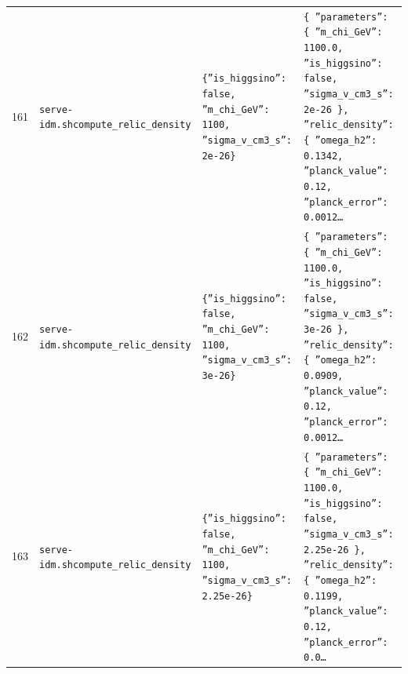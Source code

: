 \documentclass[11pt,a4paper]{article}
\begin{document}
\begin{longtable}{@{}p{}p{}p{}p{}@{}}
161 & \texttt{serve-idm.sh}\newline\texttt{compute\_\allowbreak{}relic\_\allowbreak{}density} & \texttt{\{''is\_\allowbreak{}higgsino'':\allowbreak{} false,\allowbreak{} ''m\_\allowbreak{}chi\_\allowbreak{}GeV'':\allowbreak{} 1100,\allowbreak{} ''sigma\_\allowbreak{}v\_\allowbreak{}cm3\_\allowbreak{}s'':\allowbreak{} 2e-26\}\allowbreak{}} & \texttt{\{   ''parameters'':\allowbreak{} \{     ''m\_\allowbreak{}chi\_\allowbreak{}GeV'':\allowbreak{} 1100.0,\allowbreak{}     ''is\_\allowbreak{}higgsino'':\allowbreak{} false,\allowbreak{}     ''sigma\_\allowbreak{}v\_\allowbreak{}cm3\_\allowbreak{}s'':\allowbreak{} 2e-26   \}\allowbreak{},\allowbreak{}   ''relic\_\allowbreak{}density'':\allowbreak{} \{     ''omega\_\allowbreak{}h2'':\allowbreak{} 0.1342,\allowbreak{}     ''planck\_\allowbreak{}value'':\allowbreak{} 0.12,\allowbreak{}     ''planck\_\allowbreak{}error'':\allowbreak{} 0.0012\ldots{}\allowbreak{}} \\
162 & \texttt{serve-idm.sh}\newline\texttt{compute\_\allowbreak{}relic\_\allowbreak{}density} & \texttt{\{''is\_\allowbreak{}higgsino'':\allowbreak{} false,\allowbreak{} ''m\_\allowbreak{}chi\_\allowbreak{}GeV'':\allowbreak{} 1100,\allowbreak{} ''sigma\_\allowbreak{}v\_\allowbreak{}cm3\_\allowbreak{}s'':\allowbreak{} 3e-26\}\allowbreak{}} & \texttt{\{   ''parameters'':\allowbreak{} \{     ''m\_\allowbreak{}chi\_\allowbreak{}GeV'':\allowbreak{} 1100.0,\allowbreak{}     ''is\_\allowbreak{}higgsino'':\allowbreak{} false,\allowbreak{}     ''sigma\_\allowbreak{}v\_\allowbreak{}cm3\_\allowbreak{}s'':\allowbreak{} 3e-26   \}\allowbreak{},\allowbreak{}   ''relic\_\allowbreak{}density'':\allowbreak{} \{     ''omega\_\allowbreak{}h2'':\allowbreak{} 0.0909,\allowbreak{}     ''planck\_\allowbreak{}value'':\allowbreak{} 0.12,\allowbreak{}     ''planck\_\allowbreak{}error'':\allowbreak{} 0.0012\ldots{}\allowbreak{}} \\
163 & \texttt{serve-idm.sh}\newline\texttt{compute\_\allowbreak{}relic\_\allowbreak{}density} & \texttt{\{''is\_\allowbreak{}higgsino'':\allowbreak{} false,\allowbreak{} ''m\_\allowbreak{}chi\_\allowbreak{}GeV'':\allowbreak{} 1100,\allowbreak{} ''sigma\_\allowbreak{}v\_\allowbreak{}cm3\_\allowbreak{}s'':\allowbreak{} 2.25e-26\}\allowbreak{}} & \texttt{\{   ''parameters'':\allowbreak{} \{     ''m\_\allowbreak{}chi\_\allowbreak{}GeV'':\allowbreak{} 1100.0,\allowbreak{}     ''is\_\allowbreak{}higgsino'':\allowbreak{} false,\allowbreak{}     ''sigma\_\allowbreak{}v\_\allowbreak{}cm3\_\allowbreak{}s'':\allowbreak{} 2.25e-26   \}\allowbreak{},\allowbreak{}   ''relic\_\allowbreak{}density'':\allowbreak{} \{     ''omega\_\allowbreak{}h2'':\allowbreak{} 0.1199,\allowbreak{}     ''planck\_\allowbreak{}value'':\allowbreak{} 0.12,\allowbreak{}     ''planck\_\allowbreak{}error'':\allowbreak{} 0.0\ldots{}\allowbreak{}} \\

\end{longtable}
\end{document}
